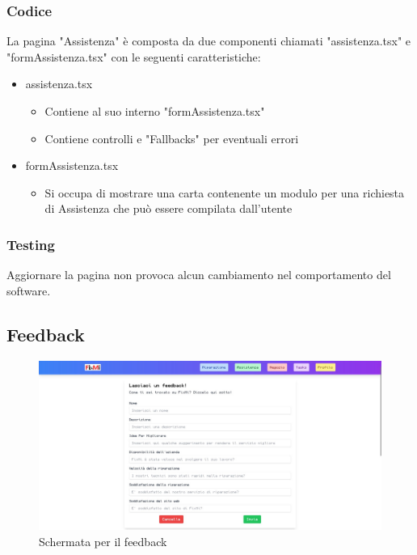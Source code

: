 \documentclass{report}
\begin{document}
\subsubsection*{Codice}
La pagina "Assistenza" è composta da due componenti chiamati "assistenza.tsx" e "formAssistenza.tsx" con le seguenti caratteristiche:
\begin{itemize}
	\item assistenza.tsx
	\begin{itemize}
		\item Contiene al suo interno "formAssistenza.tsx"
		\item Contiene controlli e "Fallbacks" per eventuali errori
	\end{itemize}
	\item formAssistenza.tsx
	\begin{itemize}
		\item Si occupa di mostrare una carta contenente un modulo per una richiesta di Assistenza che può essere compilata dall'utente
	\end{itemize}
\end{itemize}

\subsubsection*{Testing}
Aggiornare la pagina non provoca alcun cambiamento nel comportamento del software.

\subsection{Feedback}

\begin{figure}[H]
	\centering\includegraphics[width=1\textwidth]{images/microservizio-home/frontend/feedback.jpg}
	\caption{Schermata per il feedback}
\end{figure}
\end{document}
